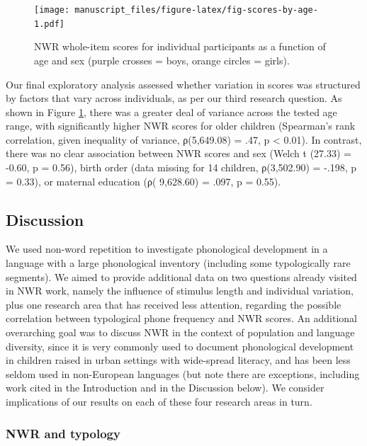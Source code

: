 \documentclass[
  american,
  ,man,floatsintext]{apa6}
\begin{document}
\begin{figure}
\centering
\texttt{[image: manuscript\_files/figure-latex/fig-scores-by-age-1.pdf]}
\caption{\label{fig:fig-scores-by-age}NWR whole-item scores for individual participants as a function of age and sex (purple crosses = boys, orange circles = girls).}
\end{figure}

Our final exploratory analysis assessed whether variation in scores was structured by factors that vary across individuals, as per our third research question. As shown in Figure \ref{fig:fig-scores-by-age}, there was a greater deal of variance across the tested age range, with significantly higher NWR scores for older children (Spearman's rank correlation, given inequality of variance, ρ(5,649.08) = .47, p \textless{} 0.01). In contrast, there was no clear association between NWR scores and sex (Welch t (27.33) = -0.60, p = 0.56), birth order (data missing for 14 children, ρ(3,502.90) = -.198, p = 0.33), or maternal education (ρ( 9,628.60) = .097, p = 0.55).

\hypertarget{discussion}{%
\subsection{Discussion}\label{discussion}}

We used non-word repetition to investigate phonological development in a language with a large phonological inventory (including some typologically rare segments). We aimed to provide additional data on two questions already visited in NWR work, namely the influence of stimulus length and individual variation, plus one research area that has received less attention, regarding the possible correlation between typological phone frequency and NWR scores. An additional overarching goal was to discuss NWR in the context of population and language diversity, since it is very commonly used to document phonological development in children raised in urban settings with wide-spread literacy, and has been less seldom used in non-European languages (but note there are exceptions, including work cited in the Introduction and in the Discussion below). We consider implications of our results on each of these four research areas in turn.

\hypertarget{nwr-and-typology-1}{%
\subsubsection{NWR and typology}\label{nwr-and-typology-1}}
\end{document}
